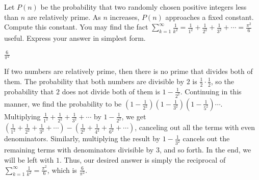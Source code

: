 \documentclass[11pt]{article}
\begin{document}
\begin{problem}
Let $P(n)$ be the probability that two randomly chosen positive integers less than $n$ are relatively prime. As $n$ increases, $P(n)$ approaches a fixed constant. Compute this constant. You may find the fact $\sum\limits_{k = 1}^\infty \frac{1}{k^2} = \frac{1}{1^2} + \frac{1}{2^2} + \frac{1}{3^2} + \cdots = \frac{\pi^2}{6}$ useful. Express your answer in simplest form.
\end{problem}
\begin{answer}
$\boxed{\frac{6}{\pi^2}}$
\end{answer}
\begin{solution}
If two numbers are relatively prime, then there is no prime that divides both of them. The probability that both numbers are divisible by $2$ is $\frac{1}{2} \cdot \frac{1}{2}$, so the probability that $2$ does not divide both of them is $1 - \frac{1}{2^2}$. Continuing in this manner, we find the probability to be $\left(1 - \frac{1}{2^2}\right)\left(1 - \frac{1}{3^2}\right)\left(1 - \frac{1}{5^2}\right) \cdots$. Multiplying $\frac{1}{1^2} + \frac{1}{2^2} + \frac{1}{3^2} + \cdots$ by $1 - \frac{1}{2^2}$, we get $(\frac{1}{1^2} + \frac{1}{2^2} + \frac{1}{3^2} + \cdots) - \left(\frac{1}{2^2} + \frac{1}{4^2} + \frac{1}{6^2} + \cdots\right)$, canceling out all the terms with even denominators. Similarly, multiplying the result by $1 - \frac{1}{3^2}$ cancels out the remaining terms with denominators divisible by $3$, and so forth. In the end, we will be left with $1$. Thus, our desired answer is simply the reciprocal of $\sum\limits_{k = 1}^\infty \frac{1}{k^2} = \frac{\pi^2}{6}$, which is $\boxed{\frac{6}{\pi^2}}$.
\end{solution}
\end{document}
